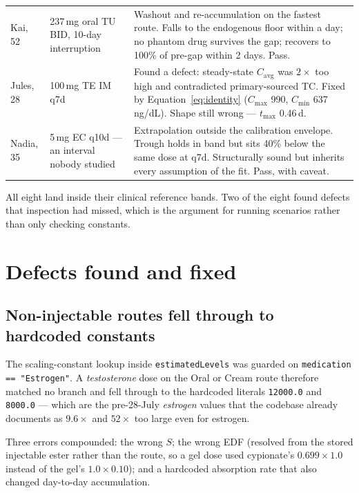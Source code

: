 \documentclass[11pt,a4paper]{article}
\newcommand{\good}[1]{#1}
\newcommand{\code}[1]{\texttt{\small #1}}
\begin{document}
\begin{longtable}{@{}p{2.6cm}p{4.5cm}p{7.4cm}@{}}
Kai, 52 & 237\,mg oral TU BID, 10-day interruption
 & Washout and re-accumulation on the fastest route. Falls to the endogenous
   floor within a day; no phantom drug survives the gap; recovers to 100\% of
   pre-gap within 2 days. \good{Pass.} \\[0.4em]
Jules, 28 & 100\,mg TE IM q7d
 & Found a defect: steady-state $C_{\mathrm{avg}}$ was $2\times$ too high and
   contradicted primary-sourced TC. \good{Fixed} by Equation~\ref{eq:identity}
   ($C_{\max}$ 990, $C_{\min}$ 637\,ng/dL). Shape still wrong --- $t_{\max}$
   0.46\,d. \\[0.4em]
Nadia, 35 & 5\,mg EC q10d --- an interval nobody studied
 & Extrapolation outside the calibration envelope. Trough holds in band but sits
   40\% below the same dose at q7d. Structurally sound but inherits every
   assumption of the fit. \good{Pass, with caveat.} \\
\bottomrule
\end{longtable}

All eight land inside their clinical reference bands. Two of the eight found
defects that inspection had missed, which is the argument for running scenarios
rather than only checking constants.

\section{Defects found and fixed}
\label{sec:defects}

\subsection{Non-injectable routes fell through to hardcoded constants}

The scaling-constant lookup inside \code{estimatedLevels} was guarded on
\code{medication == "Estrogen"}. A \emph{testosterone} dose on the Oral or Cream
route therefore matched no branch and fell through to the hardcoded literals
\code{12000.0} and \code{8000.0} --- which are the pre-28-July \emph{estrogen}
values that the codebase already documents as $9.6\times$ and $52\times$ too
large even for estrogen.

Three errors compounded: the wrong $S$; the wrong EDF (resolved from the stored
injectable ester rather than the route, so a gel dose used cypionate's
$0.699 \times 1.0$ instead of the gel's $1.0 \times 0.10$); and a hardcoded
absorption rate that also changed day-to-day accumulation.
\end{document}
